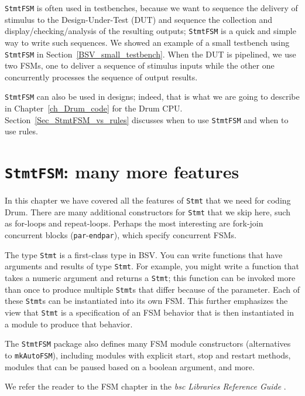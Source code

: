\verb|StmtFSM| is often used in testbenches, because we want to
sequence the delivery of stimulus to the Design-Under-Test (DUT) and
sequence the collection and display/checking/analysis of the resulting
outputs; \verb|StmtFSM| is a quick and simple way to write such
sequences.  We showed an example of a small testbench using
\verb|StmtFSM| in Section~\ref{BSV_small_testbench}.  When the DUT is
pipelined, we use two FSMs, one to deliver a sequence of stimulus
inputs while the other one concurrently processes the sequence of
output results.

\verb|StmtFSM| can also be used in designs; indeed, that is what we
are going to describe in Chapter~\ref{ch_Drum_code} for the Drum CPU.
Section~\ref{Sec_StmtFSM_vs_rules} discusses when to use
\verb|StmtFSM| and when to use rules.


\section{{\tt StmtFSM}: many more features}

\label{Sec_StmtFSM_more_features}


In this chapter we have covered all the features of \verb|Stmt| that
we need for coding Drum.  There are many additional constructors for
\verb|Stmt| that we skip here, such as for-loops and repeat-loops.
Perhaps the most interesting are fork-join concurrent blocks
(\verb|par|-\verb|endpar|), which specify concurrent FSMs.

The type \verb|Stmt| is a first-class type in BSV.  You can write
functions that have arguments and results of type \verb|Stmt|.  For
example, you might write a function that takes a numeric argument and
returns a \verb|Stmt|; this function can be invoked more than once to
produce multiple \verb|Stmt|s that differ because of the parameter.
Each of these \verb|Stmt|s can be instantiated into its own FSM.  This
further emphasizes the view that \verb|Stmt| is a specification of an
FSM behavior that is then instantiated in a module to produce that
behavior.

The \verb|StmtFSM| package also defines many FSM module constructors
(alternatives to \verb|mkAutoFSM|), including modules with explicit
start, stop and restart methods, modules that can be paused based on a
boolean argument, and more.

We refer the reader to the FSM chapter in the \emph{bsc Libraries
Reference Guide} \cite{bsc_libs_ref_guide}.

